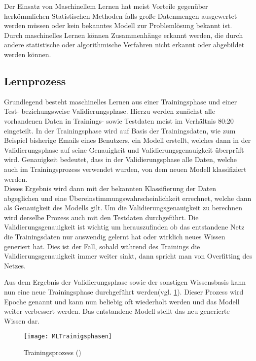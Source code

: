     Der Einsatz von Maschinellem Lernen hat meist Vorteile gegenüber herkömmlichen Statistischen Methoden falls große Datenmengen ausgewertet werden müssen
    oder kein bekanntes Modell zur Problemlösung bekannt ist.
    Durch maschinelles Lernen können Zusammenhänge erkannt werden, die durch andere statistische oder algorithmische Verfahren nicht erkannt oder abgebildet werden können.

    \subsection{Lernprozess} \label{Lernprozess}
    Grundlegend besteht maschinelles Lernen aus einer Trainingsphase und einer Test- beziehungsweise Validierungsphase.
    Hierzu werden zunächst alle vorhandenen Daten in Trainings- sowie Testdaten meist im Verhältnis 80:20 eingeteilt.
    In der Trainingsphase wird auf Basis der Trainingsdaten, wie zum Beispiel bisherige Emails eines Benutzers, ein Modell erstellt, welches dann in der Validierungsphase auf seine Genauigkeit und Validierungsgenauigkeit überprüft wird.
    Genauigkeit bedeutet, dass in der Validierungsphase alle Daten, welche auch im Trainingsprozess verwendet wurden, von dem neuen Modell klassifiziert werden.\\
    Dieses Ergebnis wird dann mit der bekannten Klassifierung der Daten abgeglichen und eine Übereinstimmungswahrscheinlichkeit errechnet, welche dann als Genauigkeit des Modells gilt.
    Um die Validierungsgenauigkeit zu berechnen wird derselbe Prozess auch mit den Testdaten durchgeführt.
    Die Validierungsgenauigkeit ist wichtig um herauszufinden ob das entstandene Netz die Trainingsdaten nur auswendig gelernt hat oder wirklich neues Wissen generiert hat.
    Dies ist der Fall, sobald während des Trainings die Validierungsgenauigkeit immer weiter sinkt, dann spricht man von Overfitting des Netzes.
    \newline

    \noindent
    Aus dem Ergebnis der Validierungsphase sowie der sonstigen Wissensbasis kann nun eine neue Trainingsphase durchgeführt werden(vgl. \ref{fig:MLTrainigsprozess}).
    Dieser Prozess wird Epoche genannt und kann nun beliebig oft wiederholt werden und das Modell weiter verbessert werden.
    Das entstandene Modell stellt das neu generierte Wissen dar.

    \begin{figure}[H]
        \centering
        \texttt{[image: MLTrainigsphasen]}
        \caption{Trainingsprozess (\cite[Figure 1-2]{HandsOnML})}
        \label{fig:MLTrainigsprozess}
    \end{figure}


